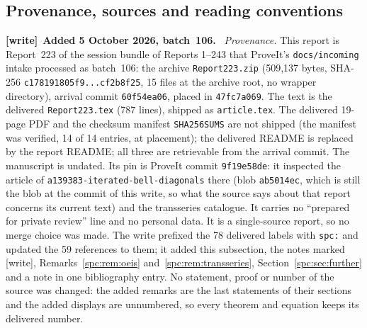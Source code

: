 \documentclass[11pt,letterpaper]{article}
\theoremstyle{definition}\newtheorem{definition}[theorem]{Definition}
\theoremstyle{remark}\newtheorem{remark}[theorem]{Remark}
\newcommand{\file}[1]{\nolinkurl{#1}}
\newenvironment{writenote}[1][]{\par\smallskip\begingroup\small
 \noindent\textbf{[write]}\if\relax\detokenize{#1}\relax\else~\textbf{#1.}\fi\ }%
 {\par\endgroup\smallskip}
\begin{document}
\subsection{Provenance, sources and reading conventions}\label{spc:sec:provenance}
\begin{writenote}[Added 5 October 2026, batch~106]
\emph{Provenance.} This report is Report~223 of the session bundle of
Reports 1--243 that ProveIt's \file{docs/incoming} intake processed as
batch~106: the archive \file{Report223.zip} (509{,}137 bytes, SHA-256
\file{c178191805f9...cf2b8f25}, 15 files at the archive root, no wrapper
directory), arrival commit \file{60f54ea06}, placed in \file{47fc7a069}. The
text is the delivered \file{Report223.tex} (787 lines), shipped as
\file{article.tex}. The delivered 19-page PDF and the checksum manifest
\file{SHA256SUMS} are not shipped (the manifest was verified, 14 of 14
entries, at placement); the delivered README is replaced by the report
README; all three are retrievable from the arrival commit. The manuscript is
undated. Its pin is ProveIt commit \file{9f19e58de}: it inspected the
article of \file{a139383-iterated-bell-diagonals} there (blob
\file{ab5014ec}, which is still the blob at the commit of this write, so what
the source says about that report concerns its current text) and the
transseries catalogue. It carries no ``prepared for private review'' line and
no personal data. It is a single-source report, so no merge choice was made.
The write prefixed the 78 delivered labels with \file{spc:} and updated the
59 references to them; it added this subsection, the notes marked [write],
Remarks~\ref{spc:rem:oeis} and~\ref{spc:rem:transseries},
Section~\ref{spc:sec:further} and a note in one bibliography entry. No
statement, proof or number of the source was changed: the added remarks are
the last statements of their sections and the added displays are unnumbered,
so every theorem and equation keeps its delivered number.


\end{writenote}
\end{document}
